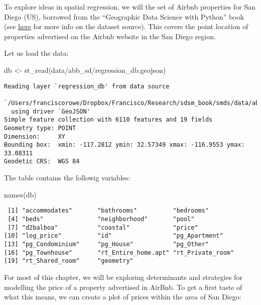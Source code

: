 \documentclass[
  letterpaper,
  krantz2]{style/krantz}
\newenvironment{Shaded}{\begin{snugshade}}{\end{snugshade}}
\newcommand{\FunctionTok}[1]{\textcolor[rgb]{0.28,0.35,0.67}{#1}}
\newcommand{\NormalTok}[1]{\textcolor[rgb]{0.00,0.23,0.31}{#1}}
\newcommand{\OtherTok}[1]{\textcolor[rgb]{0.00,0.23,0.31}{#1}}
\newcommand{\StringTok}[1]{\textcolor[rgb]{0.13,0.47,0.30}{#1}}
\begin{document}
To explore ideas in spatial regression, we will the set of Airbnb
properties for San Diego (US), borrowed from the ``Geographic Data
Science with Python'' book (see
\href{https://geographicdata.science/book/data/airbnb/regression_cleaning.html}{here}
for more info on the dataset source). This covers the point location of
properties advertised on the Airbnb website in the San Diego region.

Let us load the data:

\begin{Shaded}
\begin{Highlighting}[]
\NormalTok{db }\OtherTok{\textless{}{-}} \FunctionTok{st\_read}\NormalTok{(}\StringTok{\textquotesingle{}data/abb\_sd/regression\_db.geojson\textquotesingle{}}\NormalTok{)}
\end{Highlighting}
\end{Shaded}

\begin{verbatim}
Reading layer `regression_db' from data source 
  `/Users/franciscorowe/Dropbox/Francisco/Research/sdsm_book/smds/data/abb_sd/regression_db.geojson' 
  using driver `GeoJSON'
Simple feature collection with 6110 features and 19 fields
Geometry type: POINT
Dimension:     XY
Bounding box:  xmin: -117.2812 ymin: 32.57349 xmax: -116.9553 ymax: 33.08311
Geodetic CRS:  WGS 84
\end{verbatim}

The table contains the followig variables:

\begin{Shaded}
\begin{Highlighting}[]
\FunctionTok{names}\NormalTok{(db)}
\end{Highlighting}
\end{Shaded}

\begin{verbatim}
 [1] "accommodates"       "bathrooms"          "bedrooms"          
 [4] "beds"               "neighborhood"       "pool"              
 [7] "d2balboa"           "coastal"            "price"             
[10] "log_price"          "id"                 "pg_Apartment"      
[13] "pg_Condominium"     "pg_House"           "pg_Other"          
[16] "pg_Townhouse"       "rt_Entire_home.apt" "rt_Private_room"   
[19] "rt_Shared_room"     "geometry"          
\end{verbatim}

For most of this chapter, we will be exploring determinants and
strategies for modelling the price of a property advertised in AirBnb.
To get a first taste of what this means, we can create a plot of prices
within the area of San Diego:
\end{document}
